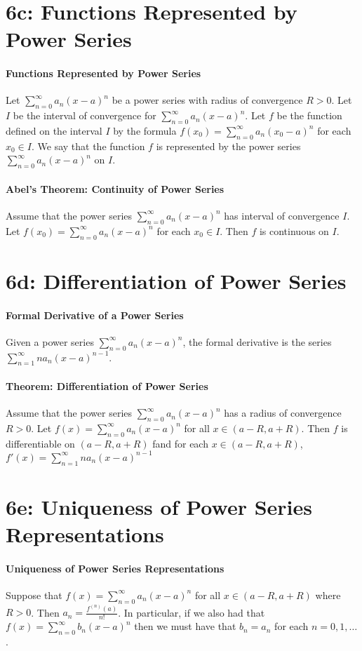 \documentclass[10pt,letter]{article}
\begin{document}
\section*{6c: Functions Represented by Power Series}
\paragraph{Functions Represented by Power Series}
Let $\sum_{n=0}^\infty a_n(x-a)^n$ be a power series with radius of convergence $R>0$. Let $I$ be the interval of convergence for $\sum_{n=0}^\infty a_n(x-a)^n$. Let $f$ be the function defined on the interval $I$ by the formula $f(x_0)=\sum_{n=0}^\infty a_n(x_0-a)^n$ for each $x_0\in I$. We say that the function $f$ is represented by the power series $\sum_{n=0}^\infty a_n(x-a)^n$ on $I$. 
\paragraph{Abel's Theorem: Continuity of Power Series}
Assume that the power series $\sum_{n=0}^\infty a_n(x-a)^n$ has interval of convergence $I$. Let $f(x_0)=\sum_{n=0}^\infty a_n(x-a)^n$ for each $x_0\in I$. Then $f$ is continuous on $I$. 


\section*{6d: Differentiation of Power Series}
\paragraph{Formal Derivative of a Power Series}
Given a power series $\sum_{n=0}^\infty a_n(x-a)^n$, the formal derivative is the series $\sum_{n=1}^\infty na_n(x-a)^{n-1}$. 
\paragraph{Theorem: Differentiation of Power Series}
Assume that the power series $\sum_{n=0}^\infty a_n(x-a)^n$ has a radius of convergence $R>0$. Let $f(x)=\sum_{n=0}^\infty a_n(x-a)^n$ for all $x\in(a-R,a+R)$. Then $f$ is differentiable on $(a-R,a+R)$ fand for each $x\in(a-R,a+R)$, $f'(x)=\sum_{n=1}^\infty na_n(x-a)^{n-1}$


\section*{6e: Uniqueness of Power Series Representations}
\paragraph{Uniqueness of Power Series Representations}
Suppose that $f(x)=\sum_{n=0}^\infty a_n(x-a)^n$ for all $x\in(a-R,a+R)$ where $R>0$. Then $a_n=\frac{f^{(n)}(a)}{n!}$. In particular, if we also had that $f(x)=\sum_{n=0}^\infty b_n(x-a)^n$ then we must have that $b_n=a_n$ for each $n=0,1,\ldots$. 
\end{document}
